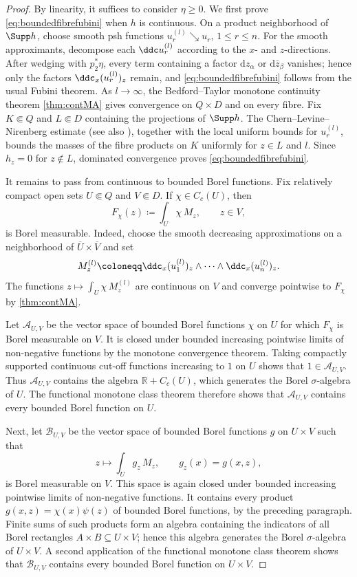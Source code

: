 \begin{proof}
    By linearity, it suffices to consider $\eta\geq0$.
    We first prove \eqref{eq:boundedfibrefubini} when $h$ is continuous.
    On a product neighborhood of $\Supp h$, choose smooth psh functions $u_r^{(l)}\searrow u_r$, $1\leq r\leq n$. For the smooth approximants, decompose each $\ddc u_r^{(l)}$ according to the $x$- and $z$-directions. After wedging with $p_2^*\eta$, every term containing a factor $\mathrm{d}z_\alpha$ or $\mathrm{d}\bar z_\beta$ vanishes; hence only the factors $\ddc_x(u_r^{(l)})_z$ remain, and \eqref{eq:boundedfibrefubini} follows from the usual Fubini theorem. As $l\to\infty$, the Bedford--Taylor monotone continuity theorem \cref{thm:contMA} gives convergence on $Q\times D$ and on every fibre. Fix $K\Subset Q$ and $L\Subset D$ containing the projections of $\Supp h$. The Chern--Levine--Nirenberg estimate \cite[Theorem~3.9]{GZ17} (see also \cite[Theorem~9.1.3]{FPT}), together with the local uniform bounds for $u_r^{(l)}$, bounds the masses of the fibre products on $K$ uniformly for $z\in L$ and $l$. Since $h_z=0$ for $z\notin L$, dominated convergence proves \eqref{eq:boundedfibrefubini}.

    It remains to pass from continuous to bounded Borel functions. Fix relatively compact open sets $U\Subset Q$ and $V\Subset D$. If $\chi\in C_c(U)$, then
    \[
        F_\chi(z)\coloneqq\int_U\chi\,M_z,
        \qquad z\in V,
    \]
    is Borel measurable. Indeed, choose the smooth decreasing approximations on a neighborhood of $\overline U\times\overline V$ and set
    \[
        M_z^{(l)}\coloneqq
        \ddc_x(u_1^{(l)})_z\wedge\cdots\wedge\ddc_x(u_n^{(l)})_z.
    \]
    The functions $z\mapsto\int_U\chi\,M_z^{(l)}$ are continuous on $V$ and converge pointwise to $F_\chi$ by \cref{thm:contMA}.

    Let $\mathcal{A}_{U,V}$ be the vector space of bounded Borel functions $\chi$ on $U$ for which $F_\chi$ is Borel measurable on $V$. It is closed under bounded increasing pointwise limits of non-negative functions by the monotone convergence theorem. Taking compactly supported continuous cut-off functions increasing to $1$ on $U$ shows that $1\in\mathcal{A}_{U,V}$. Thus $\mathcal{A}_{U,V}$ contains the algebra $\mathbb{R}+C_c(U)$, which generates the Borel $\sigma$-algebra of $U$. The functional monotone class theorem therefore shows that $\mathcal{A}_{U,V}$ contains every bounded Borel function on $U$.

    Next, let $\mathcal{B}_{U,V}$ be the vector space of bounded Borel functions $g$ on $U\times V$ such that
    \[
        z\longmapsto\int_U g_z\,M_z,
        \qquad g_z(x)=g(x,z),
    \]
    is Borel measurable on $V$. This space is again closed under bounded increasing pointwise limits of non-negative functions. It contains every product $g(x,z)=\chi(x)\psi(z)$ of bounded Borel functions, by the preceding paragraph. Finite sums of such products form an algebra containing the indicators of all Borel rectangles $A\times B\subseteq U\times V$; hence this algebra generates the Borel $\sigma$-algebra of $U\times V$. A second application of the functional monotone class theorem shows that $\mathcal{B}_{U,V}$ contains every bounded Borel function on $U\times V$.


\end{proof}
